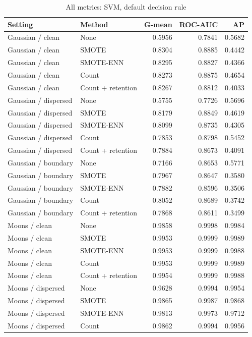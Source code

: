 \begin{table}[htbp]
\caption{All metrics: SVM, default decision rule}
\centering\small
\begin{tabular}{llrrr}
\hline
Setting & Method & G-mean & ROC-AUC & AP\\
\hline
Gaussian / clean & None & 0.5956 & 0.7841 & 0.5682 \\
Gaussian / clean & SMOTE & 0.8304 & 0.8885 & 0.4442 \\
Gaussian / clean & SMOTE-ENN & 0.8295 & 0.8827 & 0.4366 \\
Gaussian / clean & Count & 0.8273 & 0.8875 & 0.4654 \\
Gaussian / clean & Count + retention & 0.8267 & 0.8812 & 0.4033 \\
Gaussian / dispersed & None & 0.5755 & 0.7726 & 0.5696 \\
Gaussian / dispersed & SMOTE & 0.8179 & 0.8849 & 0.4619 \\
Gaussian / dispersed & SMOTE-ENN & 0.8099 & 0.8735 & 0.4305 \\
Gaussian / dispersed & Count & 0.7853 & 0.8798 & 0.5452 \\
Gaussian / dispersed & Count + retention & 0.7884 & 0.8673 & 0.4091 \\
Gaussian / boundary & None & 0.7166 & 0.8653 & 0.5771 \\
Gaussian / boundary & SMOTE & 0.7967 & 0.8647 & 0.3580 \\
Gaussian / boundary & SMOTE-ENN & 0.7882 & 0.8596 & 0.3506 \\
Gaussian / boundary & Count & 0.8052 & 0.8689 & 0.3742 \\
Gaussian / boundary & Count + retention & 0.7868 & 0.8611 & 0.3499 \\
Moons / clean & None & 0.9858 & 0.9998 & 0.9984 \\
Moons / clean & SMOTE & 0.9953 & 0.9999 & 0.9989 \\
Moons / clean & SMOTE-ENN & 0.9953 & 0.9999 & 0.9988 \\
Moons / clean & Count & 0.9953 & 0.9999 & 0.9989 \\
Moons / clean & Count + retention & 0.9954 & 0.9999 & 0.9988 \\
Moons / dispersed & None & 0.9628 & 0.9994 & 0.9954 \\
Moons / dispersed & SMOTE & 0.9865 & 0.9987 & 0.9868 \\
Moons / dispersed & SMOTE-ENN & 0.9813 & 0.9973 & 0.9712 \\
Moons / dispersed & Count & 0.9862 & 0.9994 & 0.9956 \\

\end{tabular}
\end{table}
